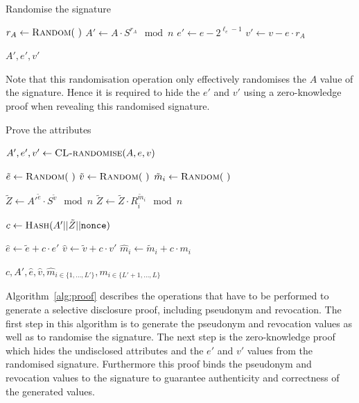 \begin{algorithm}[ht]
  \caption{Randomise the signature}
  \addtolength{\baselineskip}{1mm}
  \begin{algorithmic}[1]
      \State $r_A \gets \Call{Random}{~}$
      \State $A' \gets A \cdot S^{r_A} \mod n$
      \State $e' \gets e - 2^{\ell_{e} - 1}$
      \State $v' \gets v - e \cdot r_A$

      \State \Return $A', e', v'$
    \EndFunction
  \end{algorithmic}
\end{algorithm}

Note that this randomisation operation only effectively randomises the $A$ value
of the signature. Hence it is required to hide the $e'$ and $v'$ using a
zero-knowledge proof when revealing this randomised signature.

\begin{algorithm}
  \caption{Prove the attributes}
  \label{alg:cl_proof}
  \addtolength{\baselineskip}{1mm}
  \begin{algorithmic}[1]
      \State $A', e', v' \gets \Call{CL-randomise}{A, e, v}$

      \State $\tilde{e} \gets \Call{Random}{~}$
      \State $\tilde{v} \gets \Call{Random}{~}$
        \State $\tilde{m}_i \gets \Call{Random}{~}$
      \EndFor

      \State $\tilde{Z} \gets {A'}^{\tilde{e}} \cdot S^{\tilde{v}} \mod n$
        \State $\tilde{Z} \gets \tilde{Z} \cdot R_i^{\tilde{m}_i} \mod n$
      \EndFor

      \State $c \gets \Call{Hash}{A' || \tilde{Z} || \mathtt{nonce}}$

      \State $\hat{e} \gets \tilde{e} + c \cdot e'$
      \State $\hat{v} \gets \tilde{v} + c \cdot v'$
        \State $\hat{m}_i \gets \tilde{m}_i + c \cdot m_i$
      \EndFor

      \Return $c, A', \hat{e}, \hat{v}, \hat{m}_{i \in \{1, \dots, L'\}}, m_{i \in \{L' + 1, \dots, L\}}$
    \EndFunction
  \end{algorithmic}
\end{algorithm}

Algorithm~\ref{alg:proof} describes the operations that have to be performed to
generate a selective disclosure proof, including pseudonym and revocation. The
first step in this algorithm is to generate the pseudonym and revocation values
as well as to randomise the signature. The next step is the zero-knowledge proof
which hides the undisclosed attributes and the $e'$ and $v'$ values from the
randomised signature. Furthermore this proof binds the pseudonym and revocation
values to the signature to guarantee authenticity and correctness of the
generated values.

